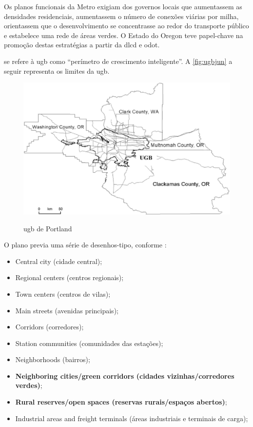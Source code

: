 	Os planos funcionais da Metro exigiam dos governos locais que aumentassem as densidades residenciais, aumentassem o número de conexões viárias por milha, orientassem que o desenvolvimento se concentrasse ao redor do transporte público e estabelece uma rede de áreas verdes. O Estado do Oregon teve papel-chave na promoção destas estratégias a partir da \gls{dlcd} e \gls{odot}.
	
	 se refere à \gls{ugb} como “perímetro de crescimento inteligente”. A \autoref{fig:ugbjun} a seguir representa os limites da \gls{ugb}.
	
	\begin{figure}
		\centering
		\caption{\glsdesc{ugb} de Portland}
		\includegraphics[width=0.9\linewidth]{img/jun2004a_01}
		\label{fig:ugbjun}
	\end{figure}
	
	O plano previa uma série de desenhos-tipo, conforme \cite[p. 10--11, tradução e grifo nossos]{metro2000a}:
	
	\begin{itemize}
		\item Central city (cidade central);
		\item Regional centers (centros regionais);
		\item Town centers (centros de vilas);
		\item Main streets (avenidas principais);
		\item Corridors (corredores);
		\item Station communities (comunidades das estações);
		\item Neighborhoods (bairros);
		\item \textbf{Neighboring cities/green corridors (cidades vizinhas/corredores verdes)};
		\item \textbf{Rural reserves/open spaces (reservas rurais/espaços abertos)};
		\item Industrial areas and freight terminals (áreas industriais e terminais de carga);
	\end{itemize}
	
